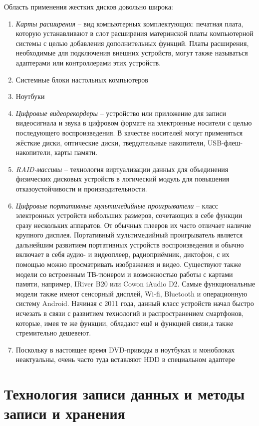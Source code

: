 \documentclass[bachelor, och, referat]{SCWorks}
\begin{document}
Область применения жестких дисков довольно широка:
\begin{enumerate}
    \item \textit{Карты расширения} -- вид компьютерных комплектующих: печатная плата, которую устанавливают в слот расширения материнской платы компьютерной системы с целью добавления дополнительных функций. Платы расширения, необходимые для подключения внешних устройств, могут также называться адаптерами или контроллерами этих устройств.
    \item Системные блоки настольных компьютеров
    \item Ноутбуки
    \item \textit{Цифровые видеорекордеры} -- устройство или приложение для записи видеосигнала и звука в цифровом формате на электронные носители с целью последующего воспроизведения. В качестве носителей могут применяться жёсткие диски, оптические диски, твердотельные накопители, USB-флеш-накопители, карты памяти.
    \item \textit{RAID-массивы} -- технология виртуализации данных для объединения физических дисковых устройств в логический модуль для повышения отказоустойчивости и производительности.
    \item \textit{Цифровые портативные мультимедийные проигрыватели} -- класс электронных устройств небольших размеров, сочетающих в себе функции сразу нескольких аппаратов. От обычных плееров их часто отличает наличие крупного дисплея. Портативный мультимедийный проигрыватель является дальнейшим развитием портативных устройств воспроизведения и обычно включает в себя аудио- и видеоплеер, радиоприёмник, диктофон, с их помощью можно просматривать изображения и видео. Существуют также модели со встроенным ТВ-тюнером и возможностью работы с картами памяти, например, IRiver B20 или Cowon iAudio D2. Самые функциональные модели также имеют сенсорный дисплей, Wi-fi, Bluetooth и операционную систему Android. Начиная с 2011 года, данный класс устройств начал быстро исчезать в связи с развитием технологий и распространением смартфонов, которые, имея те же функции, обладают ещё и функцией связи,а также стремительно дешевеют.
    \item Поскольку в настоящее время DVD-приводы в ноутбуках и моноблоках неактуальны, очень часто туда вставляют HDD в специальном адаптере
\end{enumerate}


\section{Технология записи данных и методы записи и хранения}
\end{document}
